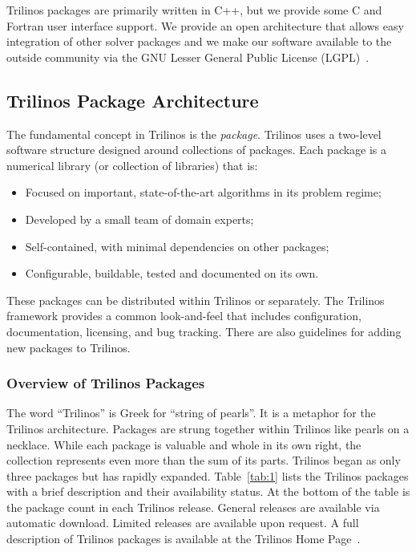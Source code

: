 \documentclass[]{llncs}      %
\begin{document}
Trilinos packages are primarily written in C++, but we provide some C
and Fortran user interface support.  We provide an open architecture
that allows easy integration of other solver packages and we make our
software available to the outside community via the GNU Lesser General
Public License (LGPL)~\cite{3}.  


\subsection*{Trilinos Package Architecture}

The fundamental concept in Trilinos is the {\sl package}.  Trilinos uses
a two-level software structure designed around collections of packages.
Each package is a numerical library (or collection of libraries) that
is: 
\begin{itemize}
\item Focused on important, state-of-the-art algorithms in its problem
regime;
\item Developed by a small team of domain experts;
\item Self-contained, with minimal dependencies on other packages;
\item Configurable, buildable, tested and documented on its own.
\end{itemize}
These packages can be distributed within Trilinos or separately. The
Trilinos framework provides a common look-and-feel that includes
configuration, documentation, licensing, and bug tracking.  There are
also guidelines for adding new packages to Trilinos.


\subsubsection*{Overview of Trilinos Packages}

The word ``Trilinos'' is Greek for ``string of pearls''. It is a
metaphor for the Trilinos architecture.  Packages are strung together
within Trilinos like pearls on a necklace. While each package is
valuable and whole in its own right, the collection represents even more
than the sum of its parts.  Trilinos began as only three packages but
has rapidly expanded.  Table~\ref{tab:1} lists the Trilinos packages
with a brief description and their availability status. At the bottom of
the table is the package count in each Trilinos release.  General
releases are available via automatic download.  Limited releases are
available upon request.  A full description of Trilinos packages is
available at the Trilinos Home Page~\cite{1}.
\end{document}
